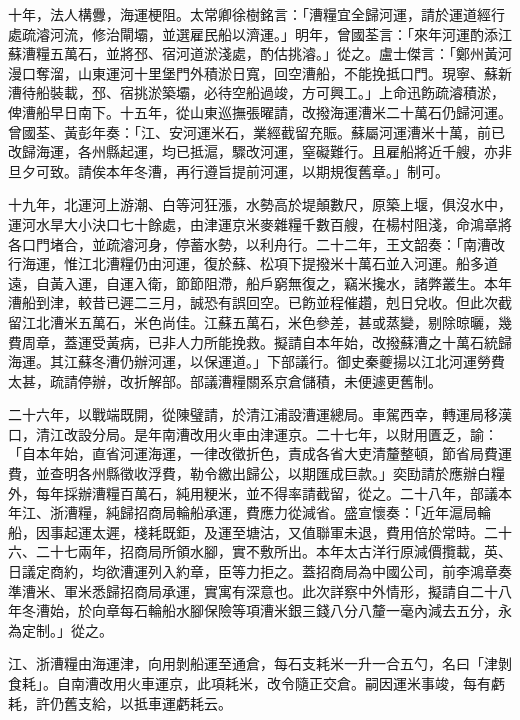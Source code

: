 \begin{pinyinscope}
十年，法人構釁，海運梗阻。太常卿徐樹銘言：「漕糧宜全歸河運，請於運道經行處疏濬河流，修治閘壩，並選雇民船以濟運。」明年，曾國荃言：「來年河運酌添江蘇漕糧五萬石，並將邳、宿河道淤淺處，酌估挑濬。」從之。盧士傑言：「鄭州黃河漫口奪溜，山東運河十里堡門外積淤日寬，回空漕船，不能挽抵口門。現寧、蘇新漕待船裝載，邳、宿挑淤築壩，必待空船過竣，方可興工。」上命迅飭疏濬積淤，俾漕船早日南下。十五年，從山東巡撫張曜請，改撥海運漕米二十萬石仍歸河運。曾國荃、黃彭年奏：「江、安河運米石，業經截留充賑。蘇屬河運漕米十萬，前已改歸海運，各州縣起運，均已抵滬，驟改河運，窒礙難行。且雇船將近千艘，亦非旦夕可致。請俟本年冬漕，再行遵旨提前河運，以期規復舊章。」制可。

十九年，北運河上游潮、白等河狂漲，水勢高於堤顛數尺，原築上堰，俱沒水中，運河水旱大小決口七十餘處，由津運京米麥雜糧千數百艘，在楊村阻淺，命鴻章將各口門堵合，並疏濬河身，停蓄水勢，以利舟行。二十二年，王文韶奏：「南漕改行海運，惟江北漕糧仍由河運，復於蘇、松項下提撥米十萬石並入河運。船多道遠，自黃入運，自運入衛，節節阻滯，船戶窮無復之，竊米攙水，諸弊叢生。本年漕船到津，較昔已遲二三月，誠恐有誤回空。已飭並程催趲，剋日兌收。但此次截留江北漕米五萬石，米色尚佳。江蘇五萬石，米色參差，甚或蒸變，剔除晾曬，幾費周章，蓋運受黃病，已非人力所能挽救。擬請自本年始，改撥蘇漕之十萬石統歸海運。其江蘇冬漕仍辦河運，以保運道。」下部議行。御史秦夔揚以江北河運勞費太甚，疏請停辦，改折解部。部議漕糧關系京倉儲積，未便遽更舊制。

二十六年，以戰端既開，從陳璧請，於清江浦設漕運總局。車駕西幸，轉運局移漢口，清江改設分局。是年南漕改用火車由津運京。二十七年，以財用匱乏，諭：「自本年始，直省河運海運，一律改徵折色，責成各省大吏清釐整頓，節省局費運費，並查明各州縣徵收浮費，勒令繳出歸公，以期匯成巨款。」奕劻請於應辦白糧外，每年採辦漕糧百萬石，純用粳米，並不得率請截留，從之。二十八年，部議本年江、浙漕糧，純歸招商局輪船承運，費應力從減省。盛宣懷奏：「近年滬局輪船，因事起運太遲，棧耗既鉅，及運至塘沽，又值聯軍未退，費用倍於常時。二十六、二十七兩年，招商局所領水腳，實不敷所出。本年太古洋行原減價攬載，英、日議定商約，均欲漕運列入約章，臣等力拒之。蓋招商局為中國公司，前李鴻章奏準漕米、軍米悉歸招商局承運，實寓有深意也。此次詳察中外情形，擬請自二十八年冬漕始，於向章每石輪船水腳保險等項漕米銀三錢八分八釐一毫內減去五分，永為定制。」從之。

江、浙漕糧由海運津，向用剝船運至通倉，每石支耗米一升一合五勺，名曰「津剝食耗」。自南漕改用火車運京，此項耗米，改令隨正交倉。嗣因運米事竣，每有虧耗，許仍舊支給，以抵車運虧耗云。


\end{pinyinscope}